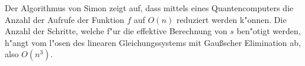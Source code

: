 \begin{refsection}

Der Algorithmus von Simon zeigt auf, dass mittels eines Quantencomputers die
Anzahl der Aufrufe der Funktion $f$ auf $O(n)$ reduziert werden k"onnen. Die
Anzahl der Schritte, welche f"ur die effektive Berechnung von $s$ ben"otigt
werden, h"angt vom l"osen des linearen Gleichungssystems mit Gaußscher
Elimination ab, also $O(n^3)$.


\printbibliography[heading=subbibliography] \end{refsection}


